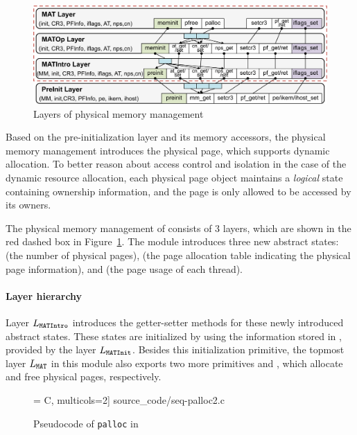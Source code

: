 {
\begin{figure}\centering
\includegraphics[scale=0.6]{figs/pmm_layer}	
\caption{Layers of physical memory management}
\label{fig:base:pmm:layers}
\hrulefill
\end{figure}
}

Based on the pre-initialization layer and its memory
accessors,
the physical memory management introduces the physical page,
which supports dynamic allocation.
To better reason about access control and isolation in the case of
the dynamic resource allocation, each physical page
object maintains a \emph{logical} state containing ownership information,
and the page is only allowed to be accessed by its owners.

The physical memory management of \mCTOSbase{}
consists of  3 layers, which are shown in the red dashed box in
Figure~\ref{fig:base:pmm:layers}.
The module introduces three new abstract states: 
 (the number
of physical pages),
 (the page allocation table
indicating the physical page information),
and  (the page usage of each thread).  

\paragraph{Layer hierarchy}
Layer $L_{\texttt{MATIntro}}$
introduces the getter-setter methods
for these newly introduced abstract states.
These states are initialized by  using the information
stored in , provided by the layer
$L_{\texttt{MATInit}}$. 
Besides this initialization primitive,
the topmost layer $L_{\texttt{MAT}}$ in this module
also exports two more primitives
 and ,
which allocate and free physical pages,
respectively.

\begin{figure}[t]
 = C, multicols=2] {source_code/seq-palloc2.c}
\caption{Pseudocode of \texttt{palloc} in \mCTOS{}}
\label{fig:seq:palloc}
\hrulefill
\end{figure}

